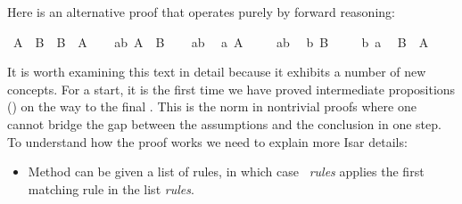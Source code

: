 \begin{isabellebody}
\begin{isamarkuptext}
Here is an alternative proof that operates purely by forward reasoning:%
\end{isamarkuptext}%
\isamarkuptrue%
\isamarkupfalse%
\ {}A\ {}\ B\ {}\ B\ {}\ A{}\isanewline
%
\isadelimproof
%
\endisadelimproof
%
\isatagproof
{}\isamarkupfalse%
\isanewline
\ \ \isamarkupfalse%
\ ab{}\ {}A\ {}\ B{}\isanewline
\ \ \isamarkupfalse%
\ ab\ \isamarkupfalse%
\ a{}\ {}A{}\ \isamarkupfalse%
\isanewline
\ \ \isamarkupfalse%
\ ab\ \isamarkupfalse%
\ b{}\ {}B{}\ \isamarkupfalse%
\isanewline
\ \ \isamarkupfalse%
\ b\ a\ \isamarkupfalse%
\ {}B\ {}\ A{}\ \isamarkupfalse%
\isanewline
{}\isamarkupfalse%
%
\endisatagproof
{\isafoldproof}%
%
\isadelimproof
%
\endisadelimproof
%
\begin{isamarkuptext}%
\noindent It is worth examining this text in detail because it
exhibits a number of new concepts.  For a start, it is the first time
we have proved intermediate propositions () on the
way to the final . This is the norm in nontrivial
proofs where one cannot bridge the gap between the assumptions and the
conclusion in one step. To understand how the proof works we need to
explain more Isar details:
\begin{itemize}
\item
Method  can be given a list of rules, in which case
~\textit{rules} applies the first matching
rule in the list \textit{rules}.

\end{itemize}
\end{isamarkuptext}
\end{isabellebody}
